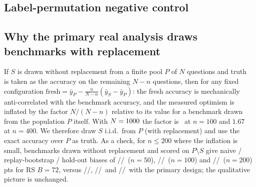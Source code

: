 \subsection{Label-permutation negative control}
\begin{table}[h]
\centering\small
\caption{Optimism (pts) of the status-quo report with real gold labels / with permuted gold labels (all configurations then at chance, accuracy about \PermAcc\%), same search procedures and benchmark draws (300 draws per cell, benchmarks drawn i.i.d.\ from the cached population).}
\label{tab:permnull}

\end{table}

\subsection{Why the primary real analysis draws benchmarks with replacement}
\label{app:wr}
If $S$ is drawn without replacement from a finite pool $P$ of $N$ questions and truth is taken as the accuracy on the remaining $N-n$ questions, then for any fixed configuration $\mathrm{fresh}=\bar y_P-\frac{n}{N-n}(\bar y_S-\bar y_P)$: the fresh accuracy is mechanically anti-correlated with the benchmark accuracy, and the measured optimism is inflated by the factor $N/(N-n)$ relative to its value for a benchmark drawn from the population $P$ itself. With $N=1000$ the factor is \PoolFactorNHund\ at $n{=}100$ and $1.67$ at $n{=}400$. We therefore draw $S$ i.i.d.\ from $P$ (with replacement) and use the exact accuracy over $P$ as truth. As a check, for $n\le200$ where the inflation is small, benchmarks drawn without replacement and scored on $P\setminus S$ give naive / replay-bootstrap / hold-out biases of \FreshNaiveRSNFifty/\FreshBootRSNFifty/\FreshHoldRSNFifty\ ($n{=}50$), \FreshNaiveRSNHund/\FreshBootRSNHund/\FreshHoldRSNHund\ ($n{=}100$) and \FreshNaiveRSNTwoH/\FreshBootRSNTwoH/\FreshHoldRSNTwoH\ ($n{=}200$) pts for RS $B{=}72$, versus \NaiveRSNFifty/\BootRSNFifty/\HoldRSNFifty, \NaiveRSNHund/\BootRSNHund/\HoldRSNHund\ and \NaiveRSNTwoH/\BootRSNTwoH/\HoldRSNTwoH\ with the primary design; the qualitative picture is unchanged.

